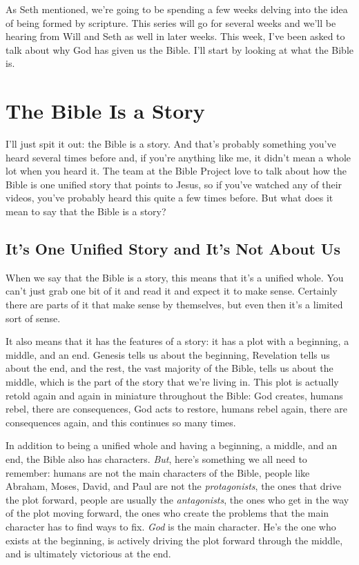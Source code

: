 \newcommand{\Date}{February 14, 2021}
\newcommand{\Title}{Teaching: What Is the Bible?}



\noindent As Seth mentioned, we're going to be spending a few weeks delving into
the idea of being formed by scripture. This series will go for several weeks and
we'll be hearing from Will and Seth as well in later weeks. This week, I've been
asked to talk about why God has given us the Bible. I'll start by looking at
what the Bible is.

\section{The Bible Is a Story}

I'll just spit it out: the Bible is a story. And that's probably something
you've heard several times before and, if you're anything like me, it didn't
mean a whole lot when you heard it. The team at the Bible Project love to talk
about how the Bible is one unified story that points to Jesus, so if you've
watched any of their videos, you've probably heard this quite a few times
before. But what does it mean to say that the Bible is a story?

\subsection{It's One Unified Story and It's Not About Us}

When we say that the Bible is a story, this means that it's a unified whole. You
can't just grab one bit of it and read it and expect it to make sense. Certainly
there are parts of it that make sense by themselves, but even then it's a
limited sort of sense.

It also means that it has the features of a story: it has a plot with a
beginning, a middle, and an end. Genesis tells us about the beginning,
Revelation tells us about the end, and the rest, the vast majority of the Bible,
tells us about the middle, which is the part of the story that we're living in.
This plot is actually retold again and again in miniature throughout the Bible:
God creates, humans rebel, there are consequences, God acts to restore, humans
rebel again, there are consequences again, and this continues so many times.

In addition to being a unified whole and having a beginning, a middle, and an
end, the Bible also has characters. \textit{But}, here's something we all need
to remember: humans are not the main characters of the Bible, people like
Abraham, Moses, David, and Paul are not the \textit{protagonists}, the ones that
drive the plot forward, people are usually the \textit{antagonists}, the ones
who get in the way of the plot moving forward, the ones who create the problems
that the main character has to find ways to fix. \textit{God} is the main
character. He's the one who exists at the beginning, is actively driving the
plot forward through the middle, and is ultimately victorious at the end.

